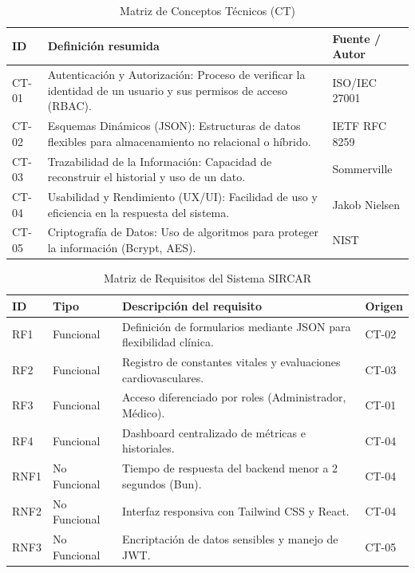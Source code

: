 \begin{table}[h!]
    \centering
    \caption{Matriz de Conceptos Técnicos (CT)}
    \begin{tabular}{|l|p{8cm}|p{4cm}|}
        \hline
        \textbf{ID} & \textbf{Definición resumida} & \textbf{Fuente / Autor} \\ \hline
        CT-01 & Autenticación y Autorización: Proceso de verificar la identidad de un usuario y sus permisos de acceso (RBAC). & ISO/IEC 27001 \\ \hline
        CT-02 & Esquemas Dinámicos (JSON): Estructuras de datos flexibles para almacenamiento no relacional o híbrido. & IETF RFC 8259 \\ \hline
        CT-03 & Trazabilidad de la Información: Capacidad de reconstruir el historial y uso de un dato. & Sommerville \\ \hline
        CT-04 & Usabilidad y Rendimiento (UX/UI): Facilidad de uso y eficiencia en la respuesta del sistema. & Jakob Nielsen \\ \hline
        CT-05 & Criptografía de Datos: Uso de algoritmos para proteger la información (Bcrypt, AES). & NIST \\ \hline
    \end{tabular}
\end{table}

\begin{table}[h!]
    \centering
    \caption{Matriz de Requisitos del Sistema SIRCAR}
    \begin{tabular}{|l|l|p{7.5cm}|l|}
        \hline
        \textbf{ID} & \textbf{Tipo} & \textbf{Descripción del requisito} & \textbf{Origen} \\ \hline
        RF1 & Funcional & Definición de formularios mediante JSON para flexibilidad clínica. & CT-02 \\ \hline
        RF2 & Funcional & Registro de constantes vitales y evaluaciones cardiovasculares. & CT-03 \\ \hline
        RF3 & Funcional & Acceso diferenciado por roles (Administrador, Médico). & CT-01 \\ \hline
        RF4 & Funcional & Dashboard centralizado de métricas e historiales. & CT-04 \\ \hline
        RNF1 & No Funcional & Tiempo de respuesta del backend menor a 2 segundos (Bun). & CT-04 \\ \hline
        RNF2 & No Funcional & Interfaz responsiva con Tailwind CSS y React. & CT-04 \\ \hline
        RNF3 & No Funcional & Encriptación de datos sensibles y manejo de JWT. & CT-05 \\ \hline
    \end{tabular}
\end{table}

